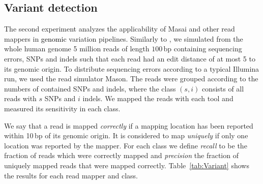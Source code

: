 \documentclass[a4,center,fleqn]{article}
\begin{document}
\subsection{Variant detection}

The second experiment analyzes the applicability of Masai and other read mappers in \textcolor{black}{genomic} variation pipelines.
Similarly to \cite{Shrimp2}, we simulated from the whole human genome 5 million reads of length $100$\,bp containing sequencing errors, SNPs and indels such that each read had an edit distance of at most 5 to its genomic origin.
To distribute sequencing errors according to a typical Illumina run, we used the read simulator Mason.
The reads were grouped according to the numbers of contained SNPs and indels, where the class $(s,i)$ consists of all reads with $s$ SNPs and $i$ indels.
We mapped the reads with each tool and measured its sensitivity in each class.

We say that a read is mapped \emph{correctly} if a mapping location has been reported within 10\,bp of its genomic origin.
It is considered to map \emph{uniquely} if only one location was reported by the mapper.
For each class we define \emph{recall} to be the fraction of reads which were correctly mapped and \emph{precision} the fraction of uniquely mapped reads that were mapped correctly.
Table~\ref{tab:Variant} shows the results for each read mapper and class.
\end{document}
